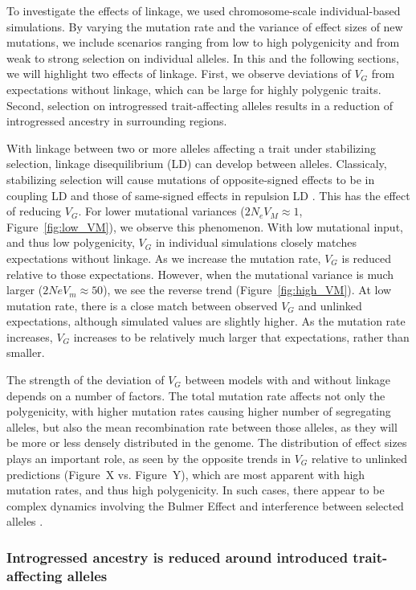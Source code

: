 \documentclass{article}
\begin{document}
To investigate the effects of linkage, we used chromosome-scale
individual-based simulations. By varying the mutation rate and the variance of
effect sizes of new mutations, we include scenarios ranging from low to high
polygenicity and from weak to strong selection on individual alleles. In this
and the following sections, we will highlight two effects of linkage. First,
we observe deviations of $V_G$ from expectations without linkage, which can be
large for highly polygenic traits. Second, selection on introgressed
trait-affecting alleles results in a reduction of introgressed ancestry in
surrounding regions.

With linkage between two or more alleles affecting a trait under stabilizing
selection, linkage disequilibrium (LD) can develop between alleles. Classicaly,
stabilizing selection will cause mutations of opposite-signed effects to be in
coupling LD and those of same-signed effects in repulsion LD
\citep{bulmer1971effect}. This has the effect of reducing $V_G$. For lower
mutational variances ($2N_e V_M\approx1$, Figure~\ref{fig:low_VM}), we observe
this phenomenon. With low mutational input, and thus low polygenicity, $V_G$ in
individual simulations closely matches expectations without linkage. As we
increase the mutation rate, $V_G$ is reduced relative to those expectations.
However, when the mutational variance is much larger ($2Ne V_m \approx 50$), we
see the reverse trend (Figure~\ref{fig:high_VM}). At low mutation rate, there
is a close match between observed $V_G$ and unlinked expectations, although
simulated values are slightly higher. As the mutation rate increases, $V_G$
increases to be relatively much larger that expectations, rather than smaller.

The strength of the deviation of $V_G$ between models with and without linkage
depends on a number of factors. The total mutation rate affects not only the
polygenicity, with higher mutation rates causing higher number of segregating
alleles, but also the mean recombination rate between those alleles, as they
will be more or less densely distributed in the genome. The distribution of
effect sizes plays an important role, as seen by the opposite trends in $V_G$
relative to unlinked predictions (Figure~X vs. Figure~Y), which are most
apparent with high mutation rates, and thus high polygenicity. In such cases,
there appear to be complex dynamics involving the Bulmer Effect
\citep{bulmer1971effect} and interference between selected alleles
\citep{hill1966effect}.

\subsubsection*{Introgressed ancestry is reduced around introduced
trait-affecting alleles}
\end{document}
